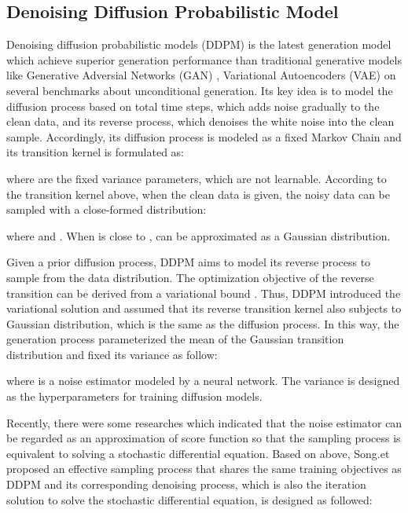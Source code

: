 \documentclass[runningheads]{llncs}
\begin{document}
\subsection{Denoising Diffusion Probabilistic Model}
Denoising diffusion probabilistic models (DDPM) is the latest generation model which achieve superior generation performance than traditional generative models like Generative Adversial Networks (GAN) \cite{gan,bigbigan,biggan}, Variational Autoencoders (VAE) \cite{nvae,vqvae,vqvae2} on several benchmarks about unconditional generation.
Its key idea is to model the diffusion process based on total  time steps, which adds noise gradually to the clean data, and its reverse process, which denoises the white noise into the clean sample.
Accordingly, its diffusion process is modeled as a fixed Markov Chain and its transition kernel is formulated as:
 
where  are the fixed variance parameters, which are not learnable.
According to the transition kernel above, when the clean data  is given, the noisy data  can be sampled with a close-formed distribution:

where  and .
When  is close to ,  can be approximated as a Gaussian distribution.

Given a prior diffusion process, DDPM aims to model its reverse process to sample from the data distribution.
The optimization objective of the reverse transition can be derived from a variational bound \cite{kingma2014auto}.
Thus, DDPM introduced the variational solution \cite{kingma2014auto} and assumed that its reverse transition kernel also subjects to Gaussian distribution, which is the same as the diffusion process.
In this way, the generation process parameterized the mean of the Gaussian transition distribution and fixed its variance as follow:

where  is a noise estimator modeled by a neural network.
The variance is designed as the hyperparameters for training diffusion models.

Recently, there were some researches \cite{scorematching,sde,ddim,dhariwal2021diffusion} which indicated that the noise estimator can be regarded as an approximation of score function so that the sampling process is equivalent to solving a stochastic differential equation.
Based on above, Song.et \cite{ddim} proposed an effective sampling process that shares the same training objectives as DDPM and its corresponding denoising process, which is also the iteration solution to solve the stochastic differential equation, is designed as followed:
\end{document}
